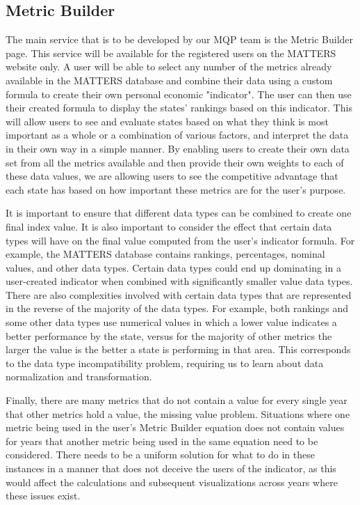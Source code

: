 	\subsection{Metric Builder}

		The main service that is to be developed by our MQP team is the Metric Builder page. This service will be available 
		for the registered users on the MATTERS website only. A user will be able to select any 
		number of the metrics already available in the MATTERS database and combine their data using a custom formula to 
		create their own personal economic "indicator". The user can then use their created formula 
		to display the states' rankings based on this indicator. This will allow users to see and 
		evaluate states based on what they think is most important as a whole or a combination of 
		various factors, and interpret the data in their own way in a simple manner. By enabling users to 
		create their own data set from all the metrics available and then provide their own weights 
		to each of these data values, we are allowing users to see the competitive advantage that each state has 
		based on how important these metrics are for the user's purpose.

		It is important to ensure that different data types can be combined to create 
		one final index value. It is also important to consider the effect that certain data types will 
		have on the final value computed from the user's indicator formula. For example, the MATTERS database 
		contains rankings, percentages, nominal values, and other data types. Certain data types could 
		end up dominating in a user-created indicator when combined with significantly smaller value 
		data types. There are also complexities involved with certain data types that are represented in 
		the reverse of the majority of the data types. For example, both rankings and some other data 
		types use numerical values in which a lower value indicates a better performance by the state, 
		versus for the majority of other metrics the larger the value is the better a state is 
		performing in that area. This corresponds to the data type incompatibility problem, requiring us to learn about data normalization and transformation. 

		Finally, there are many metrics that do not contain a value for every single year that other 
		metrics hold a value, the missing value problem. Situations where one metric being used in the user's Metric Builder equation
		does not contain values for years that another metric being used in the same equation need to be 
		considered. There needs to be a uniform solution for what to do in these instances in a manner that 
		does not deceive the users of the indicator, as this would affect the calculations and subsequent 
		visualizations across years where these issues exist.

